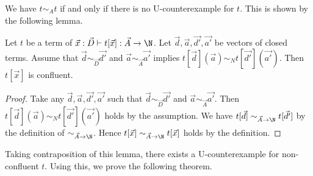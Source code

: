 We have $t \sim_A t$ if and only if there is no U-counterexample for $t$.
This is shown by the following lemma.
\begin{lemma}\label{lem:uniq_value}
  Let $t$ be a term of $\vec{x}:\vec{D} \vdash t[\vec{x}]:\vec{A}\rightarrow\N$. 
  Let $\vec{d},\vec{a},\vec{d'},\vec{a'}$ be vectors of closed terms.
  Assume that
  $\vec{d}\sim_{\vec{D}}\vec{d'}$ and $\vec{a}\sim_{\vec{A}}\vec{a'}$ implies $t[\vec{d}](\vec{a}) \sim_N t[\vec{d'}](\vec{a'})$. 
  Then $t[\vec{x}]$ is confluent. 
\end{lemma}
\begin{proof}
  Take any $\vec{d},\vec{a},\vec{d'},\vec{a'}$ such that $\vec{d}\sim_{\vec{D}}\vec{d'}$ and $\vec{a}\sim_{\vec{A}}\vec{a'}$.
  Then $t[\vec{d}](\vec{a}) \sim_N t[\vec{d'}](\vec{a'})$ holds by the assumption.
  We have $t[\vec{d}] \sim_{\vec{A}\rightarrow\N} t[\vec{d'}]$ by the definition of $\sim_{\vec{A}\rightarrow\N}$.
  Hence $t[\vec{x}] \sim_{\vec{A}\rightarrow\N} t[\vec{x}]$ holds by the definition. 
\end{proof}

Taking contraposition of this lemma, there exists a U-counterexample for non-confluent $t$. 
Using this, we prove the following theorem.

